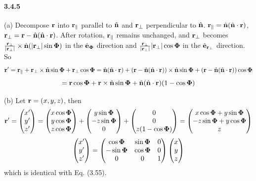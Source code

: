 \documentclass[a4paper]{article}
\begin{document}
\paragraph{3.4.5}
(a) Decompose $\mathbf{r}$ into $\mathbf{r}_{\parallel}$ parallel to $\hat{\mathbf{n}}$ and $\mathbf{r_{\perp}}$ perpendicular to $\hat{\mathbf{n}}$. 
$\mathbf{r}_{\parallel}=\hat{\mathbf{n}}(\hat{\mathbf{n}}\cdot\mathbf{r})$, $\mathbf{r_{\perp}}=\mathbf{r}-\hat{\mathbf{n}}(\hat{\mathbf{n}}\cdot\mathbf{r})$.
After rotation, $\mathbf{r}_{\parallel}$ remains unchanged, and $\mathbf{r_{\perp}}$ becomes $\frac{\mathbf{r_{\perp}}}{|\mathbf{r_{\perp}}|}\times\hat{\mathbf{n}}(|\mathbf{r_{\perp}}|\sin\mathbf{\Phi})$ in the $\hat{\mathbf{e}}_{\mathbf{\Phi}}$ direction and $\frac{\mathbf{r_{\perp}}}{|\mathbf{r_{\perp}}|}|\mathbf{r_{\perp}}|\cos\mathbf{\Phi}$ in the $\hat{\mathbf{e}}_{\mathbf{r}_{\perp}}$ direction. So 
\[\mathbf{r}'=\mathbf{r}_{\parallel}+\mathbf{r_{\perp}}\times\hat{\mathbf{n}}\sin\mathbf{\Phi}+\mathbf{r_{\perp}}\cos\mathbf{\Phi}=\hat{\mathbf{n}}(\hat{\mathbf{n}}\cdot\mathbf{r})+(\mathbf{r}-\hat{\mathbf{n}}(\hat{\mathbf{n}}\cdot\mathbf{r}))\times\hat{\mathbf{n}}\sin\mathbf{\Phi}+(\mathbf{r}-\hat{\mathbf{n}}(\hat{\mathbf{n}}\cdot\mathbf{r}))\cos\mathbf{\Phi}\]
\[
=\mathbf{r}\cos\mathbf{\Phi}+\mathbf{r}\times\hat{\mathbf{n}}\sin\mathbf{\Phi}+\hat{\mathbf{n}}(\hat{\mathbf{n}}\cdot\mathbf{r})(1-\cos\mathbf{\Phi})
\]

(b) Let $\mathbf{r}=(x,y,z)$, then 
\[
\mathbf{r}'=
\begin{pmatrix}x'\\y'\\z'\end{pmatrix}=
\begin{pmatrix}x\cos\mathbf{\Phi}\\y\cos\mathbf{\Phi}\\z\cos\mathbf{\Phi}\end{pmatrix}+
\begin{pmatrix}y\sin\mathbf{\Phi}\\-z\sin\mathbf{\Phi}\\0\end{pmatrix}+
\begin{pmatrix}0\\0\\z(1-\cos\mathbf{\Phi})\end{pmatrix}=
\begin{pmatrix}x\cos\mathbf{\Phi}+y\sin\mathbf{\Phi}\\-z\sin\mathbf{\Phi}+y\cos\mathbf{\Phi}\\z\end{pmatrix}
\]
\[
\begin{pmatrix}x'\\y'\\z'\end{pmatrix}=
\begin{pmatrix}
\cos\mathbf{\Phi}&\sin\mathbf{\Phi}&0\\
-\sin\mathbf{\Phi}&\cos\mathbf{\Phi}&0\\
0&0&1
\end{pmatrix}
\begin{pmatrix}x\\y\\z\end{pmatrix}
\]
which is identical with Eq. (3.55).
\end{document}

